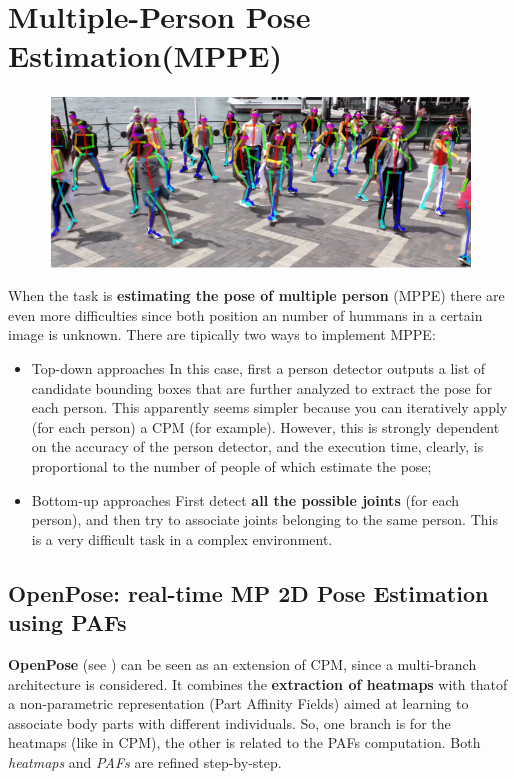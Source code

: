 \section{Multiple-Person Pose Estimation(MPPE)}
\vspace{-0.6cm}
\begin{figure}[h]
    \centering
    \includegraphics[scale=1]{img/OpenPose6.png}
\end{figure}
\noindent
When the task is \textbf{estimating the pose of multiple person} (MPPE) there are even more difficulties since both position an number of hummans in a certain image is unknown. There are tipically two ways to implement MPPE: 
\begin{itemize}
    \itemsep-0.3em
    \item \textsf{Top-down approaches} In this case, first a person detector outputs a list of candidate bounding boxes that are further analyzed to extract the pose for each person. This apparently seems simpler because you can iteratively apply (for each person) a CPM (for example). However, this is strongly dependent on the accuracy of the person detector, and the execution time, clearly, is proportional to the number of people of which estimate the pose;
    \item \textsf{Bottom-up approaches} First detect \textbf{all the possible joints} (for each person), and then try to associate joints belonging to the same person. This is a very difficult task in a complex environment.
\end{itemize}  

\subsection{OpenPose: real-time MP 2D Pose Estimation using PAFs}
\textbf{OpenPose} (see \cite{openpose}) can be seen as an extension of CPM, since a multi-branch architecture is considered. It combines the \textbf{extraction of heatmaps} with thatof a non-parametric representation (Part Affinity Fields) aimed at learning to associate body parts with different individuals. So, one branch is for the heatmaps (like in CPM), the other is related to the PAFs computation.  Both \textit{heatmaps} and \textit{PAFs} are refined step-by-step.

